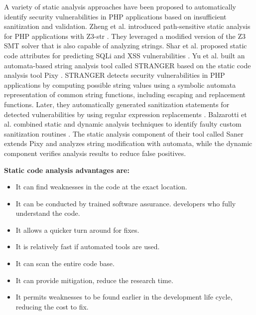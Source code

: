 A variety of static analysis approaches have been proposed
to automatically identify security vulnerabilities in PHP applications
based on insufficient sanitization and validation.
Zheng et al. introduced path-sensitive static analysis
for PHP applications with Z3-str \cite{ref_94_zheng2013path}. They leveraged a
modified version of the Z3 SMT solver that is also capable
of analyzing strings. Shar et al. proposed static code attributes
for predicting SQLi and XSS vulnerabilities \cite{ref_97_shar2012predicting, ref_98_shar2013mining}. Yu et al. built an automata-based string analysis tool
called STRANGER \cite{ref_95_yu2010stranger} based on the static code analysis
tool Pixy \cite{ref_99_jovanovic2006pixy}. STRANGER detects security vulnerabilities
in PHP applications by computing possible string
values using a symbolic automata representation of common
string functions, including escaping and replacement
functions. Later, they automatically generated sanitization
statements for detected vulnerabilities by using regular expression
replacements \cite{ref_96_yu2011patching}. Balzarotti et al. combined static
and dynamic analysis techniques to identify faulty custom
sanitization routines \cite{ref_62_balzarotti2008saner}. The static analysis component of
their tool called Saner extends Pixy and analyzes string
modification with automata, while the dynamic component
verifies analysis results to reduce false positives.

\textbf{Static code analysis advantages are:}
\begin{itemize}
	\item It can find weaknesses in the code at the exact location.
	\item It can be conducted by trained software assurance. developers who fully understand the code.
	\item It allows a quicker turn around for fixes.
	\item It is relatively fast if automated tools are used.
	\item It can scan the entire code base.
	\item It can provide mitigation, reduce the research time.
	\item It permits weaknesses to be found earlier in the development life cycle, reducing the cost to fix.
\end{itemize}

